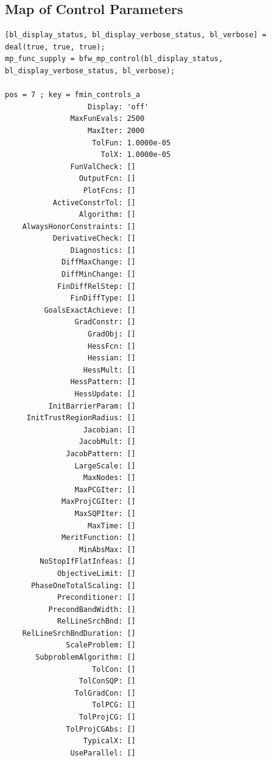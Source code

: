 \documentclass[
]{book}
\begin{document}
\hypertarget{map-of-control-parameters}{%
\subsection{Map of Control Parameters}\label{map-of-control-parameters}}

\begin{verbatim}
[bl_display_status, bl_display_verbose_status, bl_verbose] = deal(true, true, true);
mp_func_supply = bfw_mp_control(bl_display_status, bl_display_verbose_status, bl_verbose);

pos = 7 ; key = fmin_controls_a
                   Display: 'off'
               MaxFunEvals: 2500
                   MaxIter: 2000
                    TolFun: 1.0000e-05
                      TolX: 1.0000e-05
               FunValCheck: []
                 OutputFcn: []
                  PlotFcns: []
           ActiveConstrTol: []
                 Algorithm: []
    AlwaysHonorConstraints: []
           DerivativeCheck: []
               Diagnostics: []
             DiffMaxChange: []
             DiffMinChange: []
            FinDiffRelStep: []
               FinDiffType: []
         GoalsExactAchieve: []
                GradConstr: []
                   GradObj: []
                   HessFcn: []
                   Hessian: []
                  HessMult: []
               HessPattern: []
                HessUpdate: []
          InitBarrierParam: []
     InitTrustRegionRadius: []
                  Jacobian: []
                 JacobMult: []
              JacobPattern: []
                LargeScale: []
                  MaxNodes: []
                MaxPCGIter: []
             MaxProjCGIter: []
                MaxSQPIter: []
                   MaxTime: []
             MeritFunction: []
                 MinAbsMax: []
        NoStopIfFlatInfeas: []
            ObjectiveLimit: []
      PhaseOneTotalScaling: []
            Preconditioner: []
          PrecondBandWidth: []
            RelLineSrchBnd: []
    RelLineSrchBndDuration: []
              ScaleProblem: []
       SubproblemAlgorithm: []
                    TolCon: []
                 TolConSQP: []
                TolGradCon: []
                    TolPCG: []
                 TolProjCG: []
              TolProjCGAbs: []
                  TypicalX: []
               UseParallel: []


\end{verbatim}
\end{document}
